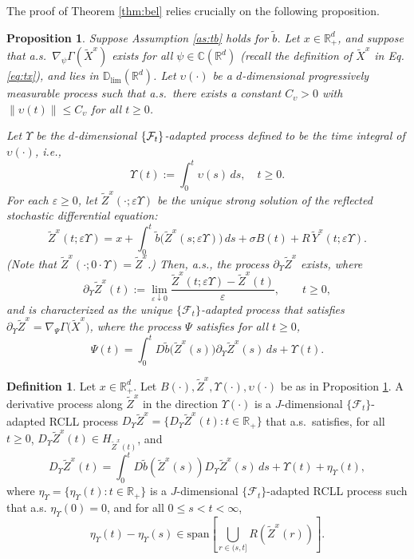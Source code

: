 \documentclass[11pt]{article}
\theoremstyle{definition}
\newtheorem{definition}[assumption]{Definition}
\theoremstyle{plain}
\newtheorem{proposition}[assumption]{Proposition}
\newcommand{\C}{\mathbb{C}}
\newcommand{\D}{\mathbb{D}}
\newcommand{\cF}{{\cal F}}
\newcommand{\tb}{\tilde{b}}
\newcommand{\veps}{\varepsilon}
\begin{document}
The proof of Theorem \ref{thm:bel} relies crucially on the following proposition. 
\begin{proposition}\label{prop:bel}
Suppose Assumption \ref{as:tb} holds for $\tb$. Let $x \in \mathbb{R}_+^d$, and suppose that a.s.\ $\nabla_\psi \Gamma\left(\tilde X^x\right)$ exists for all $\psi \in \C(\mathbb{R}^d)$ 
(recall the definition of $\tilde X^x$ in Eq. \eqref{eq:tx}), 
and lies in $\D_{\text{lim}}(\mathbb{R}^d)$. Let $\upsilon(\cdot)$ be a $d$-dimensional progressively measurable process such that a.s.\ there exists a constant $C_\upsilon > 0$ with $\|\upsilon(t)\| \le C_\upsilon$ for all $t \geq 0$.

Let $\Upsilon$ be the $d$-dimensional $\{\cF_t\}$-adapted process defined to be the time integral of $\upsilon(\cdot)$, i.e., 
\[
\Upsilon(t) := \int_0^t \upsilon(s)\,ds, \quad t\geq 0.
\]
For each $\veps \geq 0$, let $\tilde Z^x(\cdot; \veps \Upsilon)$ be the unique strong solution of the reflected stochastic differential equation:
\[
\tilde Z^x(t; \veps \Upsilon) = x + \int_0^t \tb\bigl( \tilde Z^x(s; \veps \Upsilon) \bigr)\,ds + \sigma B(t) + R\,\tilde Y^x(t; \veps \Upsilon).
\]
(Note that $\tilde Z^x(\cdot; 0 \cdot \Upsilon) = \tilde Z^x$.)
Then, a.s., the process $\partial_\Upsilon \tilde Z^x$ exists, where
\[
\partial_\Upsilon \tilde Z^x(t) := \lim_{\varepsilon \downarrow 0} \frac{\tilde Z^x(t; \varepsilon \Upsilon) - \tilde Z^x(t)}{\varepsilon}, \qquad t \ge 0,
\]
and is characterized as the unique $\{\mathcal{F}_t\}$-adapted process that satisfies $\partial_\Upsilon \tilde Z^x = \nabla_\Psi \Gamma \bigl(\tilde X^x\bigr)$, 
where the process $\Psi$ satisfies for all $t \ge 0$,
\[
\Psi(t) = \int_0^t D\tb\bigl( \tilde Z^x(s) \bigr) \partial_\Upsilon \tilde Z^x(s)\,ds + \Upsilon(t).
\]
\end{proposition}



\begin{definition}\label{def:deriv-M}
Let \( x \in \mathbb{R}_+^d \). Let \( B(\cdot), \tilde{Z}^x, \Upsilon(\cdot), \upsilon(\cdot) \) be as in Proposition \ref{prop:bel}.  
A derivative process along \( \tilde{Z}^x \) in the direction \( \Upsilon(\cdot) \) is a \( J \)-dimensional \( \{\mathcal{F}_t\} \)-adapted RCLL process
$D_\Upsilon \tilde{Z}^x = \{ D_\Upsilon \tilde{Z}^x(t) : t \in \mathbb{R}_+ \}$ 
that a.s.\ satisfies, for all \( t \ge 0 \), \( D_\Upsilon \tilde{Z}^x(t) \in H_{\tilde{Z}^x(t)} \), and
\[
D_\Upsilon \tilde{Z}^x(t) = \int_0^t D\tb(\tilde{Z}^x(s)) D_\Upsilon \tilde{Z}^x(s)\,ds + \Upsilon(t) + \eta_\Upsilon(t),
\]
where \( \eta_\Upsilon = \{ \eta_\Upsilon(t) : t \in \mathbb{R}_+ \} \) is a \( J \)-dimensional \( \{\mathcal{F}_t\} \)-adapted RCLL process such that a.s. 
$\eta_\Upsilon(0) = 0$, and for all $0 \le s < t < \infty$,
\[
\eta_\Upsilon(t) - \eta_\Upsilon(s) \in \text{span} \left[ \bigcup_{r \in (s,t]} R(\tilde{Z}^x(r)) \right].
\]
\end{definition}
\end{document}

